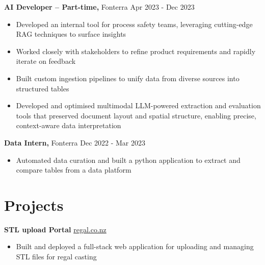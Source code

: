 \documentclass[11pt]{article}       %
\begin{document}
\textbf{AI Developer -- Part-time,} {Fonterra} \hfill Apr 2023 - Dec 2023 \\
\vspace{-9pt}
\begin{itemize}
    
        \item Developed an internal tool for process safety teams, leveraging cutting-edge RAG techniques to surface insights
    
        \item Worked closely with stakeholders to refine product requirements and rapidly iterate on feedback
    
        \item Built custom ingestion pipelines to unify data from diverse sources into structured tables
    
        \item Developed and optimised multimodal LLM-powered extraction and evaluation tools that preserved document layout and spatial structure, enabling precise, context-aware data interpretation
    
\end{itemize}

\textbf{Data Intern,} {Fonterra} \hfill Dec 2022 - Mar 2023 \\
\vspace{-9pt}
\begin{itemize}
    
        \item Automated data curation and built a python application to extract and compare tables from a data platform
    
\end{itemize}


\vspace{-18.5pt}

\section*{Projects}

\textbf{STL upload Portal} \hfill \href{https://www.regal.co.nz}{regal.co.nz} \\
\vspace{-9pt}
\begin{itemize}
    
        \item Built and deployed a full-stack web application for uploading and managing STL files for regal casting
    \end{itemize}
\end{document}

